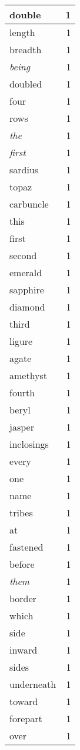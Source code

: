 \begin{center}
\begin{longtable}{l|r}
double & 1 \\ \hline
length & 1 \\ \hline
breadth & 1 \\ \hline
\emph{being} & 1 \\ \hline
doubled & 1 \\ \hline
four & 1 \\ \hline
rows & 1 \\ \hline
\emph{the} & 1 \\ \hline
\emph{first} & 1 \\ \hline
sardius & 1 \\ \hline
topaz & 1 \\ \hline
carbuncle & 1 \\ \hline
this & 1 \\ \hline
first & 1 \\ \hline
second & 1 \\ \hline
emerald & 1 \\ \hline
sapphire & 1 \\ \hline
diamond & 1 \\ \hline
third & 1 \\ \hline
ligure & 1 \\ \hline
agate & 1 \\ \hline
amethyst & 1 \\ \hline
fourth & 1 \\ \hline
beryl & 1 \\ \hline
jasper & 1 \\ \hline
inclosings & 1 \\ \hline
every & 1 \\ \hline
one & 1 \\ \hline
name & 1 \\ \hline
tribes & 1 \\ \hline
at & 1 \\ \hline
fastened & 1 \\ \hline
before & 1 \\ \hline
\emph{them} & 1 \\ \hline
border & 1 \\ \hline
which & 1 \\ \hline
side & 1 \\ \hline
inward & 1 \\ \hline
sides & 1 \\ \hline
underneath & 1 \\ \hline
toward & 1 \\ \hline
forepart & 1 \\ \hline
over & 1 \\ \hline

\end{longtable}
\end{center}

